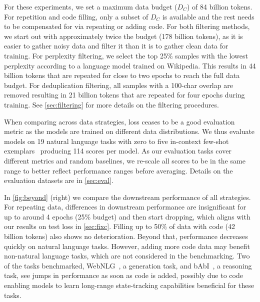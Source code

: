 \documentclass{article}
\begin{document}
For these experiments, we set a maximum data budget ($D_C$) of 84 billion tokens. For repetition and code filling, only a subset of $D_C$ is available and the rest needs to be compensated for via repeating or adding code. For both filtering methods, we start out with approximately twice the budget (178 billion tokens), as it is easier to gather noisy data and filter it than it is to gather clean data for training. For perplexity filtering, we select the top 25\% samples with the lowest perplexity according to a language model trained on Wikipedia. This results in 44 billion tokens that are repeated for close to two epochs to reach the full data budget. For deduplication filtering, all samples with a 100-char overlap are removed resulting in 21 billion tokens that are repeated for four epochs during training. See \autoref{sec:filtering} for more details on the filtering procedures.

When comparing across data strategies, loss ceases to be a good evaluation metric as the models are trained on different data distributions. We thus evaluate models on 19 natural language tasks with zero to five in-context few-shot exemplars~\cite{brown2020language} producing 114 scores per model. As our evaluation tasks cover different metrics and random baselines, we re-scale all scores to be in the same range to better reflect performance ranges before averaging. Details on the evaluation datasets are in \autoref{sec:eval}.

In \autoref{fig:beyond} (right) we compare the downstream performance of all strategies. For repeating data, differences in downstream performance are insignificant for up to around 4 epochs (25\% budget) and then start dropping, which aligns with our results on test loss in \autoref{sec:fixc}. Filling up to 50\% of data with code (42 billion tokens) also shows no deterioration. Beyond that, performance decreases quickly on natural language tasks. However, adding more code data may benefit non-natural language tasks, which are not considered in the benchmarking. Two of the tasks benchmarked, WebNLG~\cite{castro-ferreira20:bilin-bi-direc-webnl-shared,gehrmann2021gem}, a generation task, and bAbI~\cite{weston2015towards,liang2022holistic}, a reasoning task, see jumps in performance as soon as code is added, possibly due to code enabling models to learn long-range state-tracking capabilities beneficial for these tasks. 
\end{document}
